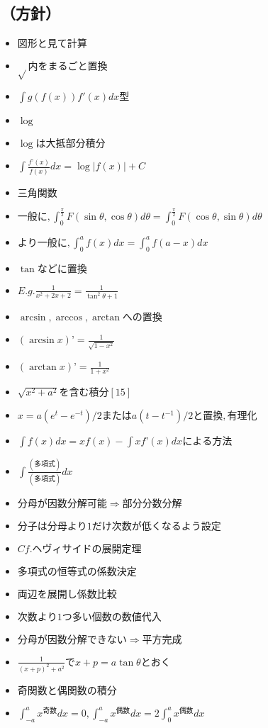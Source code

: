 \documentclass[dvipdfmx,uplatex]{jsarticle}
\begin{document}
\subsection{（方針）}
\begin{itemize}
	\item $ 図形と見て計算$
	\item $ \sqrt{} 内をまるごと置換$
	\item $ \int g(f(x))f'(x)dx 型$
	\item $ \log$
		\item $ \log は大抵部分積分$
		\item $ \int \frac{f’(x)}{f(x)}dx = \log |f(x)| + C$
	\item $ 三角関数$
		\item $ 一般に, \int^{\frac{\pi}{2}}_0 F(\sin \theta, \cos \theta)d \theta = \int^{\frac{\pi}{2}}_0 F(\cos \theta, \sin \theta)d \theta$
			\item $ より一般に, \int^a_0 f(x)dx = \int^a_0 f(a-x)dx$
		\item $ \tan などに置換$
			\item $ E.g. \frac{1}{x^2+2x+2} = \frac{1}{\tan^2 \theta + 1}$
		\item $ \arcsin, \arccos, \arctan への置換$
			\item $ (\arcsin x)’ = \frac{1}{\sqrt{1 - x^2}}$
			\item $ (\arctan x)’ = \frac{1}{1 + x^2}$
		\item $ \sqrt{x^2 + a^2} を含む積分 [15]$
			\item $  x = a(e^t - e^{-t})/2 または a(t - t^{-1})/2 と置換,有理化$
			\item $ \int f(x)dx = xf(x) - \int xf’(x)dx による方法$
	\item $ \int \frac{(多項式)}{(多項式)}dx$
		\item $ 分母が因数分解可能⇒部分分数分解$
		\item $  分子は分母より1だけ次数が低くなるよう設定$
		\item $ Cf. ヘヴィサイドの展開定理$
		\item $ 多項式の恒等式の係数決定$
		\item $ 両辺を展開し係数比較$
		\item $ 次数より1つ多い個数の数値代入$
		\item $ 分母が因数分解できない⇒平方完成$
		\item $ \frac{1}{(x + p)^2 + a^2} で x + p = a \tan \theta とおく$
	\item $ 奇関数と偶関数の積分$
		\item $ \int^a_{-a} x^{奇数}dx = 0, \int^a_{-a} x^{偶数}dx = 2\int^a_0 x^{偶数}dx$

\end{itemize}
\end{document}

